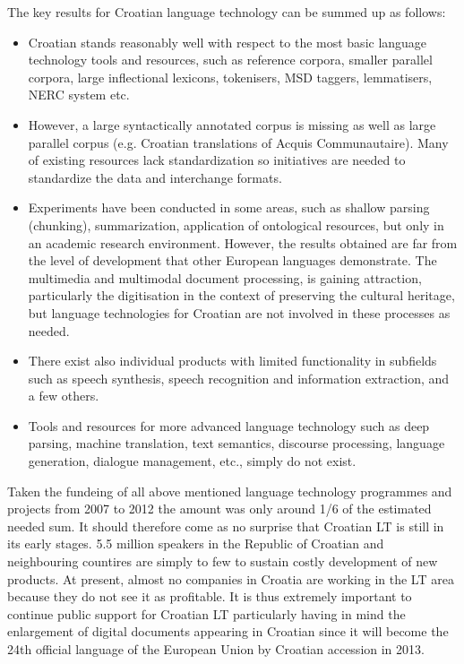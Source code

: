 \begin{multicols}{2}
The key results for Croatian language technology can be summed up as follows:

\begin{itemize}
\item Croatian stands reasonably well with respect to the most basic language technology tools and resources, such as reference corpora, smaller parallel corpora, large inflectional lexicons, tokenisers, MSD taggers, lemmatisers, NERC system etc.
\item However, a large syntactically annotated corpus is missing as well as large parallel corpus (e.g. Croatian translations of Acquis Communautaire). Many of existing resources lack standardization so initiatives are needed to standardize the data and interchange formats.
\item Experiments have been conducted in some areas, such as shallow parsing (chunking), summarization, application of ontological resources, but only in an academic research environment. However, the results obtained are far from the level of development that other European languages demonstrate. The multimedia and multimodal document processing, is gaining attraction, particularly the digitisation in the context of preserving the cultural heritage, but language technologies for Croatian are not involved in these processes as needed.
\item There exist also individual products with limited functionality in subfields such as speech synthesis, speech recognition and information extraction, and a few others.
\item Tools and resources for more advanced language technology such as deep parsing, machine translation, text semantics, discourse processing, language generation, dialogue management, etc., simply do not exist.
\end{itemize}

Taken the fundeing of all above mentioned language technology programmes and projects from 2007 to 2012 the amount was only around 1/6 of the estimated needed sum. It should therefore come as no surprise that Croatian LT is still in its early stages. 5.5 million speakers in the Republic of Croatian and neighbouring countires are simply to few to sustain costly development of new products. At present, almost no companies in Croatia are working in the LT area because they do not see it as profitable. It is thus extremely important to continue public support for Croatian LT particularly having in mind the enlargement of digital documents appearing in Croatian since it will become the 24th official language of the European Union by Croatian accession in 2013.


\end{multicols}
